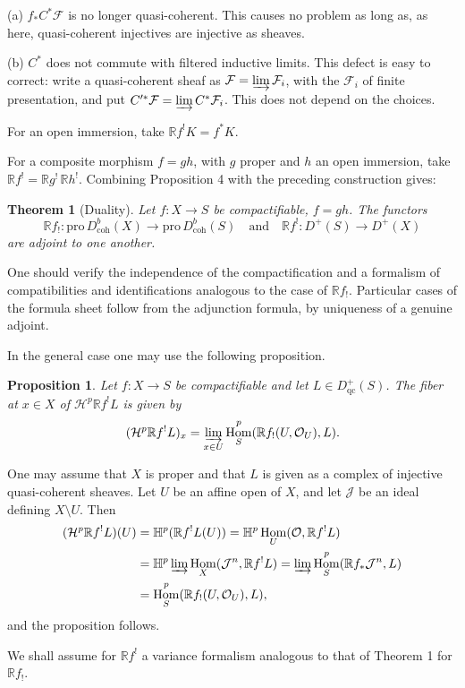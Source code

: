 \documentclass[12pt]{amsart}
\theoremstyle{plain}
\newtheorem{prop}{Proposition}
\newtheorem{thm}{Theorem}
\theoremstyle{definition}
\DeclareMathOperator{\Hom}{Hom}
\newcommand{\Pro}{\text{pro}\,}
\newcommand{\coh}{\text{coh}}
\newcommand{\cF}{\mathcal{F}}
\newcommand{\cH}{\mathcal{H}}
\newcommand{\cJ}{\mathcal{J}}
\newcommand{\cO}{\mathcal{O}}
\newcommand{\cDb}{D^{b}}
\newcommand{\cD}{D}
\newcommand{\bH}{\mathbb{H}}
\newcommand{\bR}{\mathbb{R}}
\begin{document}
(a) $f_*C^*\cF$ is no longer quasi-coherent. This causes no problem as long as, as here, quasi-coherent injectives are injective as sheaves.

(b) $C^*$ does not commute with filtered inductive limits. This defect is easy to correct: write a quasi-coherent sheaf as $\cF=\varinjlim\cF_i$, with the $\cF_i$ of finite presentation, and put $C'^*\cF=\varinjlim C^*\cF_i$. This does not depend on the choices.

For an open immersion, take $\bR f^!K=f^*K$.

For a composite morphism $f=gh$, with $g$ proper and $h$ an open immersion, take $\bR f^!=\bR g^!\,\bR h^!$. Combining Proposition 4 with the preceding construction gives:

\begin{thm}[Duality]
Let $f:X\to S$ be compactifiable, $f=gh$. The functors
\[
\bR f_!:\Pro\cDb_{\coh}(X)\to\Pro\cDb_{\coh}(S)
\quad\text{and}\quad
\bR f^!:\cD^+(S)\to\cD^+(X)
\]
are adjoint to one another.
\end{thm}

One should verify the independence of the compactification and a formalism of compatibilities and identifications analogous to the case of $\bR f_!$. Particular cases of the formula sheet follow from the adjunction formula, by uniqueness of a genuine adjoint.

In the general case one may use the following proposition.

\begin{prop}
Let $f:X\to S$ be compactifiable and let $L\in\cD^+_{\mathrm{qc}}(S)$. The fiber at $x\in X$ of $\cH^p\bR f^!L$ is given by
\[
(\cH^p\bR f^!L)_x=\varinjlim_{x\in U}\Hom^p_S(\bR f_!(U,\cO_U),L).
\]
\end{prop}

One may assume that $X$ is proper and that $L$ is given as a complex of injective quasi-coherent sheaves. Let $U$ be an affine open of $X$, and let $\cJ$ be an ideal defining $X\setminus U$. Then
\begin{align*}
(\cH^p\bR f^!L)(U)&=\bH^p(\bR f^!L(U))=\bH^p\Hom_U(\cO,\bR f^!L)\\
&=\bH^p\varinjlim\Hom_X(\cJ^n,\bR f^!L)=\varinjlim\Hom^p_S(\bR f_*\cJ^n,L)\\
&=\Hom^p_S(\bR f_!(U,\cO_U),L),
\end{align*}
and the proposition follows.

We shall assume for $\bR f^!$ a variance formalism analogous to that of Theorem 1 for $\bR f_!$.
\end{document}

